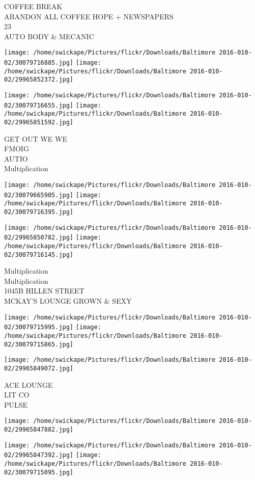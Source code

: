 \documentclass[10pt,letterpaper]{article}
\begin{document}
COFFEE BREAK\\
ABANDON ALL COFFEE HOPE + NEWSPAPERS\\
23\\
AUTO BODY \& MECANIC
\pagebreak

\texttt{[image: /home/swickape/Pictures/flickr/Downloads/Baltimore 2016-010-02/30079716885.jpg]}
\texttt{[image: /home/swickape/Pictures/flickr/Downloads/Baltimore 2016-010-02/29965852372.jpg]}

\texttt{[image: /home/swickape/Pictures/flickr/Downloads/Baltimore 2016-010-02/30079716655.jpg]}
\texttt{[image: /home/swickape/Pictures/flickr/Downloads/Baltimore 2016-010-02/29965851592.jpg]}

GET OUT WE WE\\
FMOIG\\
AUTIO\\
Multiplication
\pagebreak

\texttt{[image: /home/swickape/Pictures/flickr/Downloads/Baltimore 2016-010-02/30079665905.jpg]}
\texttt{[image: /home/swickape/Pictures/flickr/Downloads/Baltimore 2016-010-02/30079716395.jpg]}

\texttt{[image: /home/swickape/Pictures/flickr/Downloads/Baltimore 2016-010-02/29965850782.jpg]}
\texttt{[image: /home/swickape/Pictures/flickr/Downloads/Baltimore 2016-010-02/30079716145.jpg]}

Multiplication\\
Multiplication\\
1045B HILLEN STREET\\
MCKAY'S LOUNGE GROWN \& SEXY
\pagebreak

\texttt{[image: /home/swickape/Pictures/flickr/Downloads/Baltimore 2016-010-02/30079715995.jpg]}
\texttt{[image: /home/swickape/Pictures/flickr/Downloads/Baltimore 2016-010-02/30079715865.jpg]}

\texttt{[image: /home/swickape/Pictures/flickr/Downloads/Baltimore 2016-010-02/29965849072.jpg]}

ACE LOUNGE\\
LIT CO\\
PULSE
\pagebreak

\texttt{[image: /home/swickape/Pictures/flickr/Downloads/Baltimore 2016-010-02/29965847882.jpg]}

\vspace{0.25in}
\texttt{[image: /home/swickape/Pictures/flickr/Downloads/Baltimore 2016-010-02/29965847392.jpg]}
\texttt{[image: /home/swickape/Pictures/flickr/Downloads/Baltimore 2016-010-02/30079715095.jpg]}
\end{document}
